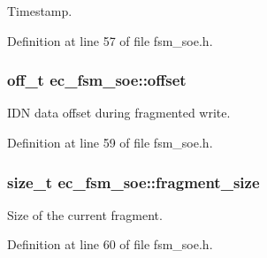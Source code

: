 \-Timestamp. 



\-Definition at line 57 of file fsm\-\_\-soe.\-h.

\subsubsection[{offset}]{\setlength{\rightskip}{0pt plus 5cm}off\-\_\-t {\bf ec\-\_\-fsm\-\_\-soe\-::offset}}\label{structec__fsm__soe_a2e2bdcd1fdb5d507480e0c29a97ce7d0}


\-I\-D\-N data offset during fragmented write. 



\-Definition at line 59 of file fsm\-\_\-soe.\-h.

\subsubsection[{fragment\-\_\-size}]{\setlength{\rightskip}{0pt plus 5cm}size\-\_\-t {\bf ec\-\_\-fsm\-\_\-soe\-::fragment\-\_\-size}}\label{structec__fsm__soe_ae3f6c643ecacae3364064dc9f466c95a}


\-Size of the current fragment. 



\-Definition at line 60 of file fsm\-\_\-soe.\-h.

